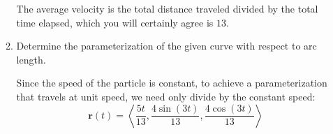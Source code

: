 \documentclass[10pt]{article}
\newcommand{\vr}{\mathbf{r}}
\newenvironment{red}{\color{red}}{\ignorespacesafterend}
\begin{document}
\begin{enumerate}[leftmargin=0pt]
\begin{enumerate}
    \begin{red}
        The average velocity is the total distance traveled divided by the total time elapsed, which you will certainly agree is $13$.
    \end{red}
    \item Determine the parameterization of the given curve with respect to arc length.

    \begin{red}
        Since the speed of the particle is constant, to achieve a parameterization that travels at unit speed, we need only divide by the constant speed:
        \[\vr(t) = \left\langle
            \frac{5t}{13}, \frac{4\sin(3t)}{13}, \frac{4\cos(3t)}{13}
        \right\rangle \]
    \end{red}
\end{enumerate}

\end{enumerate}
	
\end{document}
